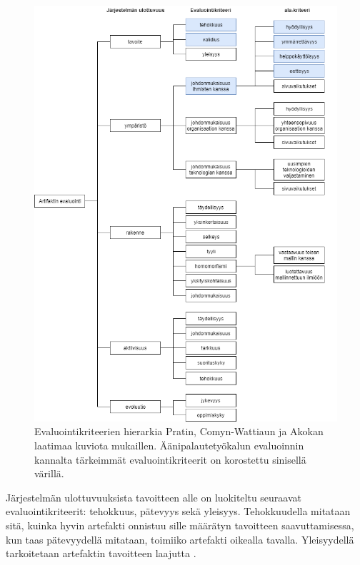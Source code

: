 \documentclass[utf8]{gradu3}
\begin{document}
\begin{figure}[H]\centering
{}
  \includegraphics[width=\textwidth,height=\textheight,keepaspectratio]{evaluointikriteerit}
  \caption[]{Evaluointikriteerien hierarkia Pratin, Comyn-Wattiaun ja Akokan \parencite[][]{evaluation} laatimaa kuviota mukaillen. Äänipalautetyökalun evaluoinnin kannalta tärkeimmät evaluointikriteerit on korostettu sinisellä värillä.}
  \label{fig:evaluointikriteerit}
\restoregeometry
\end{figure}

Järjestelmän ulottuvuuksista tavoitteen alle on luokiteltu seuraavat evaluointikriteerit:  tehokkuus, pätevyys sekä yleisyys. Tehokkuudella mitataan sitä, kuinka hyvin artefakti onnistuu sille määrätyn tavoitteen saavuttamisessa, kun taas pätevyydellä mitataan, toimiiko artefakti oikealla tavalla. Yleisyydellä tarkoitetaan artefaktin tavoitteen laajutta \parencite[][]{evaluation}.
\end{document}
